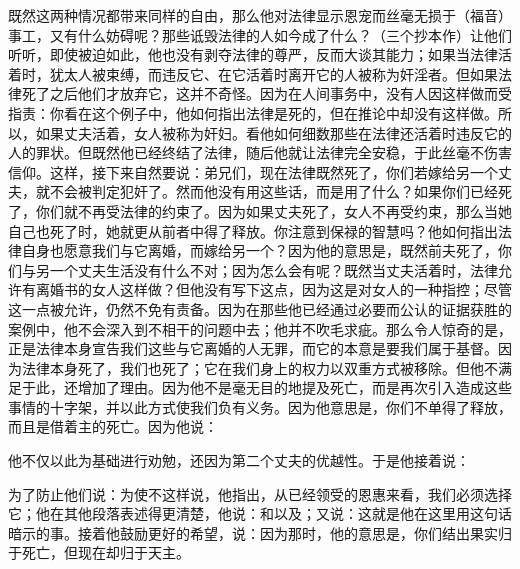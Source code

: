 既然这两种情况都带来同样的自由，那么他对法律显示恩宠而丝毫无损于（福音）事工，又有什么妨碍呢？那些诋毁法律的人如今成了什么？（三个抄本作）让他们听听，即使被迫如此，他也没有剥夺法律的尊严，反而大谈其能力；如果当法律活着时，犹太人被束缚，而违反它、在它活着时离开它的人被称为奸淫者。但如果法律死了之后他们才放弃它，这并不奇怪。因为在人间事务中，没有人因这样做而受指责：你看在这个例子中，他如何指出法律是死的，但在推论中却没有这样做。所以，如果丈夫活着，女人被称为奸妇。看他如何细数那些在法律还活着时违反它的人的罪状。但既然他已经终结了法律，随后他就让法律完全安稳，于此丝毫不伤害信仰。这样，接下来自然要说：弟兄们，现在法律既然死了，你们若嫁给另一个丈夫，就不会被判定犯奸了。然而他没有用这些话，而是用了什么？如果你们已经死了，你们就不再受法律的约束了。因为如果丈夫死了，女人不再受约束，那么当她自己也死了时，她就更从前者中得了释放。你注意到保禄的智慧吗？他如何指出法律自身也愿意我们与它离婚，而嫁给另一个？因为他的意思是，既然前夫死了，你们与另一个丈夫生活没有什么不对；因为怎么会有呢？既然当丈夫活着时，法律允许有离婚书的女人这样做？但他没有写下这点，因为这是对女人的一种指控；尽管这一点被允许，仍然不免有责备。因为在那些他已经通过必要而公认的证据获胜的案例中，他不会深入到不相干的问题中去；他并不吹毛求疵。那么令人惊奇的是，正是法律本身宣告我们这些与它离婚的人无罪，而它的本意是要我们属于基督。因为法律本身死了，我们也死了；它在我们身上的权力以双重方式被移除。但他不满足于此，还增加了理由。因为他不是毫无目的地提及死亡，而是再次引入造成这些事情的十字架，并以此方式使我们负有义务。因为他意思是，你们不单得了释放，而且是借着主的死亡。因为他说：\par

\par

他不仅以此为基础进行劝勉，还因为第二个丈夫的优越性。于是他接着说：\par

为了防止他们说：为使不这样说，他指出，从已经领受的恩惠来看，我们必须选择它；他在其他段落表述得更清楚，他说：和以及；又说：这就是他在这里用这句话暗示的事。接着他鼓励更好的希望，说：因为那时，他的意思是，你们结出果实归于死亡，但现在却归于天主。\par

